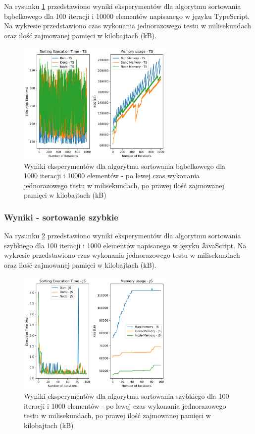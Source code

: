 Na rysunku \ref{fig:bubble_sorting_e4_ts} przedstawiono wyniki eksperymentów dla algorytmu sortowania bąbelkowego dla 100 iteracji i 10000 elementów napisanego w języku TypeScript. Na wykresie przedstawiono czas wykonania jednorazowego testu w milisekundach oraz ilość zajmowanej pamięci w kilobajtach (kB).

\begin{figure}[H]
  \centering
  \includegraphics[width=0.68\textwidth]{Figures/sorting/sorting_bubble_1000_10000_ts.png}
  \caption{Wyniki eksperymentów dla algorytmu sortowania bąbelkowego dla 1000 iteracji i 10000 elementów - po lewej czas wykonania jednorazowego testu w milisekundach, po prawej ilość zajmowanej pamięci w kilobajtach (kB)}
  \label{fig:bubble_sorting_e4_ts}
\end{figure}

\subsubsection{Wyniki - sortowanie szybkie}
Na rysunku \ref{fig:quick_sorting_e1} przedstawiono wyniki eksperymentów dla algorytmu sortowania szybkiego dla 100 iteracji i 1000 elementów napisanego w języku JavaScript. Na wykresie przedstawiono czas wykonania jednorazowego testu w milisekundach oraz ilość zajmowanej pamięci w kilobajtach (kB).

\begin{figure}[H]
  \centering
  \includegraphics[width=0.68\textwidth]{Figures/sorting/sorting_quick_100_1000_js.png}
  \caption{Wyniki eksperymentów dla algorytmu sortowania szybkiego dla 100 iteracji i 1000 elementów - po lewej czas wykonania jednorazowego testu w milisekundach, po prawej ilość zajmowanej pamięci w kilobajtach (kB)}
  \label{fig:quick_sorting_e1}
\end{figure}

